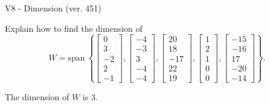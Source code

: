 \begin{exercise}
  \begin{exerciseTitle}V8 - Dimension (ver. 451)\end{exerciseTitle}
  \begin{exerciseStatement}
    Explain how to find the dimension of 
\[W=\mathrm{span}\ \left\{\left[\begin{array}{r}
0 \\
3 \\
-2 \\
2 \\
-1
\end{array}\right] , \left[\begin{array}{r}
-4 \\
-3 \\
3 \\
-4 \\
-4
\end{array}\right] , \left[\begin{array}{r}
20 \\
18 \\
-17 \\
22 \\
19
\end{array}\right] , \left[\begin{array}{r}
1 \\
2 \\
1 \\
0 \\
0
\end{array}\right] , \left[\begin{array}{r}
-15 \\
-16 \\
17 \\
-20 \\
-14
\end{array}\right]\right\}.\]



  \end{exerciseStatement}
  \begin{exerciseAnswer}
   The dimension of \(W\) is  \(3\).
  


  \end{exerciseAnswer}
\end{exercise}